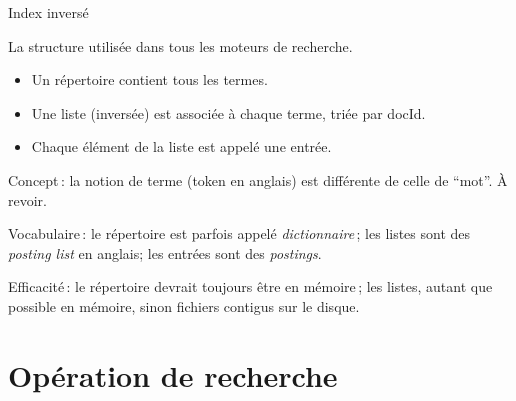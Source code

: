 \begin{frame}{Index inversé}

La structure utilisée dans \alert{tous}  les moteurs de recherche.

\begin{itemize}
 \item Un \alert{répertoire} contient tous les \alert{termes}.
 \item Une \alert{liste} (inversée) est associée à chaque \alert{terme}, \alert{triée} par docId.
 \item  Chaque élément de la liste est appelé une \alert{entrée}.
\end{itemize}

\vfill

\alert{Concept}\,: la notion de \alert{terme} (\alert{token} en anglais) est différente de celle de ``mot''. À revoir.
\vfill

\alert{Vocabulaire}\,: le répertoire est parfois appelé \emph{dictionnaire}\,; les listes sont des \emph{posting list} en anglais;
les entrées sont des \emph{postings}.

\vfill

\alert{Efficacité}\,: le répertoire devrait toujours être en mémoire\,; les listes, autant que possible en mémoire, sinon
fichiers contigus sur le disque.
\end{frame}

\section{Opération de recherche}


